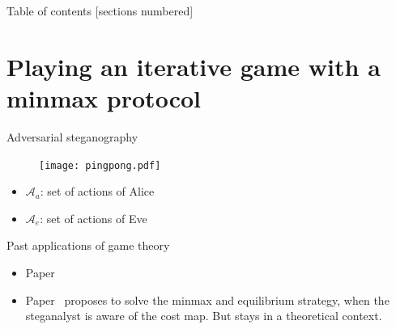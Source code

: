 \documentclass[10pt,aspectratio=169]{beamer}
\begin{document}



    


\begin{frame}{Table of contents}
    [sections numbered]
    \tableofcontents[hideallsubsections]
\end{frame}



\section{Playing an iterative game with a \textbf{minmax} protocol}


\begin{frame}{Adversarial steganography}
    
    \begin{figure}
        \texttt{[image: pingpong.pdf]}
    \end{figure}

    \begin{center}
        \begin{itemize}
            \item $\mathcal{A}_a$: set of actions of Alice
            \item $\mathcal{A}_e$: set of actions of Eve
        \end{itemize}
    \end{center}

\end{frame}


\begin{frame}{Past applications of game theory}

    \begin{itemize}
        \item Paper~
        \item Paper~ proposes to solve the minmax and equilibrium strategy, when the steganalyst is aware of the cost map. But stays in a theoretical context.
    \end{itemize}
    
\end{frame}
\end{document}
